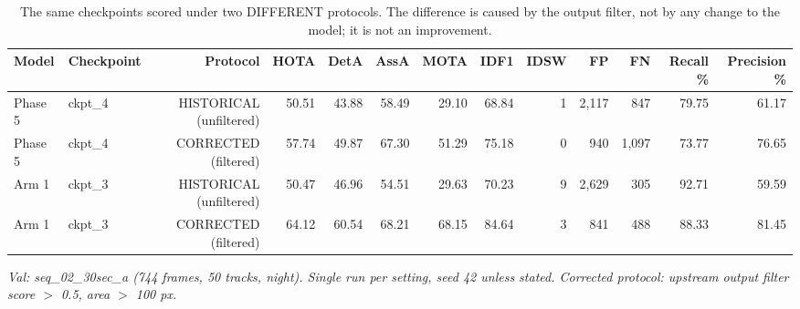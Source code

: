 \begin{table}[t]
\centering
\small
\caption{The same checkpoints scored under two DIFFERENT protocols. The difference is caused by the output filter, not by any change to the model; it is not an improvement.}
\begin{tabular}{llrrrrrrrrrrr}
\toprule
Model & Checkpoint & Protocol & HOTA & DetA & AssA & MOTA & IDF1 & IDSW & FP & FN & Recall \% & Precision \% \\
\midrule
Phase 5 & ckpt\_4 & HISTORICAL (unfiltered) & 50.51 & 43.88 & 58.49 & 29.10 & 68.84 & 1 & 2,117 & 847 & 79.75 & 61.17 \\
Phase 5 & ckpt\_4 & CORRECTED (filtered) & 57.74 & 49.87 & 67.30 & 51.29 & 75.18 & 0 & 940 & 1,097 & 73.77 & 76.65 \\
Arm 1 & ckpt\_3 & HISTORICAL (unfiltered) & 50.47 & 46.96 & 54.51 & 29.63 & 70.23 & 9 & 2,629 & 305 & 92.71 & 59.59 \\
Arm 1 & ckpt\_3 & CORRECTED (filtered) & 64.12 & 60.54 & 68.21 & 68.15 & 84.64 & 3 & 841 & 488 & 88.33 & 81.45 \\
\bottomrule
\end{tabular}
\par\smallskip\footnotesize\emph{Val: seq\_02\_30sec\_a (744 frames, 50 tracks, night). Single run per setting, seed 42 unless stated. Corrected protocol: upstream output filter score $>$ 0.5, area $>$ 100 px.}
\end{table}
